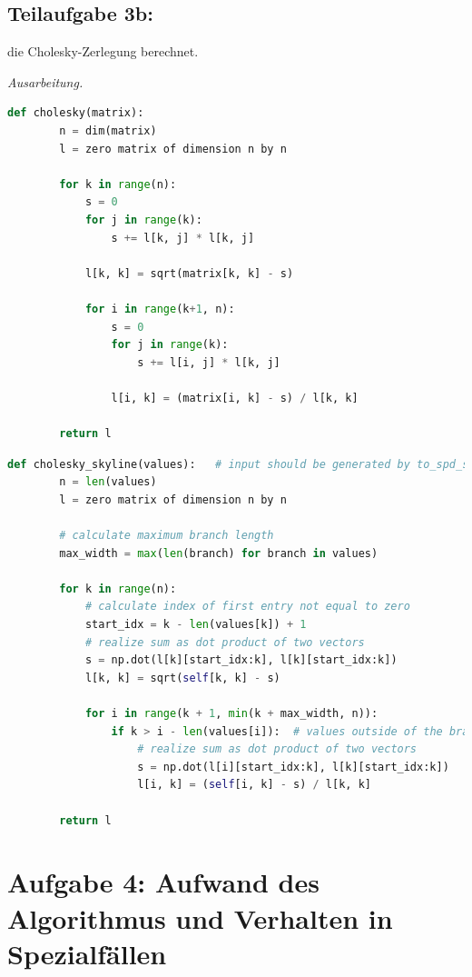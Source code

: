 \documentclass[]{article}
\newenvironment{ausarbeitung}{\vspace{3mm}\noindent\textit{Ausarbeitung.}}{}
\begin{document}
\subsection*{Teilaufgabe 3b:}
die Cholesky-Zerlegung berechnet.

\begin{ausarbeitung}
	\begin{lstlisting}[language=Python, caption=Algorithmus für die Cholesky Zerlegung einer Matrix aus der Vorlesung]
	def cholesky(matrix):	
		n = dim(matrix)
		l = zero matrix of dimension n by n

		for k in range(n):
			s = 0
			for j in range(k):
				s += l[k, j] * l[k, j]

			l[k, k] = sqrt(matrix[k, k] - s)

			for i in range(k+1, n):
				s = 0
				for j in range(k):
					s += l[i, j] * l[k, j]

				l[i, k] = (matrix[i, k] - s) / l[k, k]

		return l
	\end{lstlisting}
	
	\begin{lstlisting}[language=Python, caption=Optimierter Algorithmus für die Cholesky Zerlegung einer Skyline-Matrix]
	def cholesky_skyline(values):	# input should be generated by to_spd_skyline
		n = len(values)
		l = zero matrix of dimension n by n

		# calculate maximum branch length
		max_width = max(len(branch) for branch in values)

		for k in range(n):
			# calculate index of first entry not equal to zero
			start_idx = k - len(values[k]) + 1
			# realize sum as dot product of two vectors
			s = np.dot(l[k][start_idx:k], l[k][start_idx:k])
			l[k, k] = sqrt(self[k, k] - s)

			for i in range(k + 1, min(k + max_width, n)):
				if k > i - len(values[i]):	# values outside of the branch are zero
					# realize sum as dot product of two vectors
					s = np.dot(l[i][start_idx:k], l[k][start_idx:k])
					l[i, k] = (self[i, k] - s) / l[k, k]

		return l
	\end{lstlisting}
\end{ausarbeitung}
\newpage



\section*{Aufgabe 4: Aufwand des Algorithmus und Verhalten in Spezialfällen}
\end{document}
